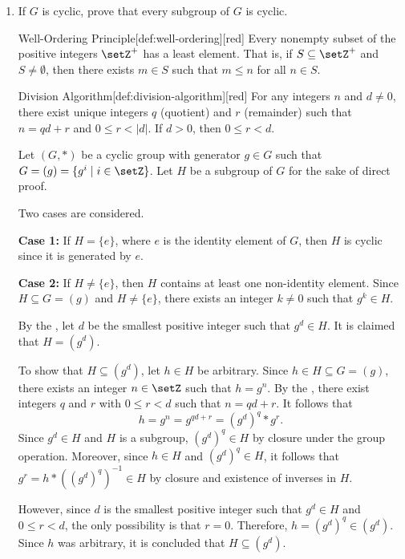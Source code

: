 \begin{enumerate}
  \newpage
  \item If $G$ is cyclic, prove that every subgroup of $G$ is cyclic.
  \begin{define}{Well-Ordering Principle}[def:well-ordering][red]
    Every nonempty subset of the positive integers $\setZ^+$ has a least element. 
    That is, if $S \subseteq \setZ^+$ and $S \neq \emptyset$, then there exists $m \in S$ such that $m \leq n$ for all $n \in S$.
  \end{define}
  \begin{define}{Division Algorithm}[def:division-algorithm][red]
    For any integers $n$ and $d \neq 0$, there exist unique integers $q$ (quotient) and $r$ (remainder) such that 
    $n = qd + r$ and $0 \leq r < |d|$. If $d > 0$, then $0 \leq r < d$.
  \end{define}
  \begin{subprove}
    Let $(G, *)$ be a cyclic group with generator $g \in G$ such that $G = (g) = \{g^i \mid i \in \setZ\}$.
    Let $H$ be a subgroup of $G$ for the sake of direct proof.
    
    Two cases are considered.
    
    \textbf{Case 1:} If $H = \{e\}$, where $e$ is the identity element of $G$, then $H$ is cyclic since it is generated by $e$.
    
    \textbf{Case 2:} If $H \neq \{e\}$, then $H$ contains at least one non-identity element.
    Since $H \subseteq G = (g)$ and $H \neq \{e\}$, there exists an integer $k \neq 0$ such that $g^k \in H$.
    
    By the , let $d$ be the smallest positive integer such that $g^d \in H$.
    It is claimed that $H = (g^d)$.
    
    To show that $H \subseteq (g^d)$, let $h \in H$ be arbitrary.
    Since $h \in H \subseteq G = (g)$, there exists an integer $n \in \setZ$ such that $h = g^n$.
    By the , there exist integers $q$ and $r$ with $0 \leq r < d$ such that $n = qd + r$.
    It follows that
    \[
      h = g^n = g^{qd + r} = (g^d)^q * g^r.
    \]
    Since $g^d \in H$ and $H$ is a subgroup, $(g^d)^q \in H$ by closure under the group operation.
    Moreover, since $h \in H$ and $(g^d)^q \in H$, it follows that $g^r = h * ((g^d)^q)^{-1} \in H$ by closure and existence of inverses in $H$.
    
    However, since $d$ is the smallest positive integer such that $g^d \in H$ and $0 \leq r < d$, 
    the only possibility is that $r = 0$.
    Therefore, $h = (g^d)^q \in (g^d)$.
    Since $h$ was arbitrary, it is concluded that $H \subseteq (g^d)$.
    

\end{subprove}
\end{enumerate}
